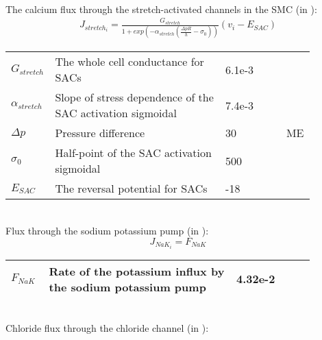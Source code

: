 \\
%
The calcium flux through the stretch-activated channels in the SMC (in \uMs): 
\begin{equation} \label{eq:Jstretchi}
\begin{split}
J_{stretch_{i}}= \frac{G_{stretch}}{1+ exp\left(-\alpha_{stretch}  \left(  \frac{\Delta pR}{h} -\sigma_{0}   \right) \right)}  \left(  v_{i}-E_{SAC}   \right) 
\end{split}
\end{equation}
%
\begin{table}[h!]
\centering
\begin{tabular}{| p{0.09\linewidth} | >{\footnotesize} p{0.57\linewidth} | >{\footnotesize} p{0.2\linewidth} | >{\footnotesize} p{0.02\linewidth} |}
\arrayrulecolor{lightgrey}\hline
$G_{stretch}$      		& The whole cell conductance for SACs						& 6.1e-3 \uMpmVs	&\cite{Koenigsberger2006} \\
$\alpha_{stretch}$      & Slope of stress dependence of the SAC activation sigmoidal	& 7.4e-3 \pmmHg	&\cite{Koenigsberger2006} \\
$ \Delta p $			& Pressure difference										& 30 \mmHg			& ME \\
$\sigma_{0}$      		& Half-point of the SAC activation sigmoidal				& 500 \mmHg			&\cite{Koenigsberger2006} \\
$E_{SAC}$      			& The reversal potential for SACs							& -18 \mV			&\cite{Koenigsberger2006} \\
\hline
\end{tabular}
\label{tab:Jstretchi}
\end{table}
\\
%
\newpage
Flux through the sodium potassium pump (in \uMs): 
\begin{equation} \label{eq:J_NaK_i}
J_{NaK_{i}}= F_{NaK}
\end{equation}
%
\begin{table}[h!]
\centering
\begin{tabular}{| p{0.09\linewidth} | >{\footnotesize} p{0.57\linewidth} | >{\footnotesize} p{0.2\linewidth} | >{\footnotesize} p{0.02\linewidth} |}
\arrayrulecolor{lightgrey}\hline
$F_{NaK}$      			& Rate of the potassium influx by the sodium potassium pump 		& 4.32e-2 \uMps 	&\cite{Koenigsberger2006} \\
\hline
\end{tabular}
\label{tab:JNaKi}
\end{table}
\\
Chloride flux through the chloride channel (in \uMs):
